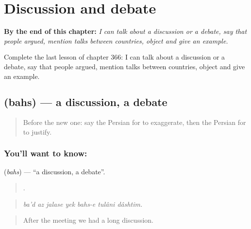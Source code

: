
\chapter{Discussion and debate}
\label{ch:fa-discussion-and-debate}

\begin{chapteropening}
\textbf{By the end of this chapter:} \emph{I can talk about a discussion or a debate, say that people argued, mention talks between countries, object and give an example.}

Complete the last lesson of chapter 366: I can talk about a discussion or a debate, say that people argued, mention talks between countries, object and give an example.
\end{chapteropening}

\section[\texorpdfstring{\fa{بحث} (bahs)}{بحث (bahs)}]{ (bahs) — a discussion, a debate}

\label{lesson:FA-C366-bahs}



\begin{quote}
Before the new one: say the Persian for to exaggerate, then the Persian for to justify.
\end{quote}

\subsection*{You'll want to know: }
\textbf{} (\emph{bahs}) — \textquotedblleft{}a discussion, a debate\textquotedblright{}.

\begin{quote}
      .
\end{quote}

\begin{quote}
\emph{ba'd az jalase yek bahs-e tulâni dâshtim.}
\end{quote}

\begin{quote}
After the meeting we had a long discussion.
\end{quote}

